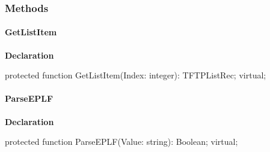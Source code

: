 \documentclass{report}
\newif\ifpdf
\begin{document}
\subsubsection*{\large{\textbf{Methods}}\normalsize\hspace{1ex}\hfill}
\paragraph*{GetListItem}\hspace*{\fill}

\label{ftpsend.TFTPList-GetListItem}
\begin{list}{}{
\setlength{\itemindent}{0cm}
\setlength{\listparindent}{0cm}
\setlength{\leftmargin}{\evensidemargin}
\addtolength{\leftmargin}{\tmplength}
\settowidth{\labelsep}{X}
\addtolength{\leftmargin}{\labelsep}
\setlength{\labelwidth}{\tmplength}
}
\item[\textbf{Declaration}\hfill]
\ifpdf
\begin{flushleft}
\fi
\begin{ttfamily}
protected function GetListItem(Index: integer): TFTPListRec; virtual;\end{ttfamily}

\ifpdf
\end{flushleft}
\fi

\end{list}
\paragraph*{ParseEPLF}\hspace*{\fill}

\label{ftpsend.TFTPList-ParseEPLF}
\begin{list}{}{
\setlength{\itemindent}{0cm}
\setlength{\listparindent}{0cm}
\setlength{\leftmargin}{\evensidemargin}
\addtolength{\leftmargin}{\tmplength}
\settowidth{\labelsep}{X}
\addtolength{\leftmargin}{\labelsep}
\setlength{\labelwidth}{\tmplength}
}
\item[\textbf{Declaration}\hfill]
\ifpdf
\begin{flushleft}
\fi
\begin{ttfamily}
protected function ParseEPLF(Value: string): Boolean; virtual;\end{ttfamily}

\ifpdf
\end{flushleft}
\fi

\end{list}
\end{document}
